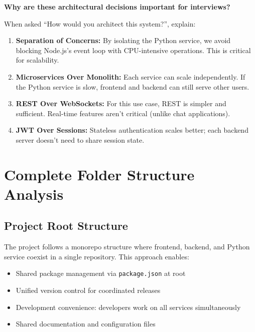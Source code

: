 \documentclass[12pt,a4paper,oneside]{article}
\newcommand{\fileref}[1]{\texttt{#1}}
\begin{document}
\begin{interviewtipbox}
\textbf{Why are these architectural decisions important for interviews?}

When asked ``How would you architect this system?'', explain:

\begin{enumerate}
    \item \textbf{Separation of Concerns:} By isolating the Python service, we avoid blocking Node.js's event loop with CPU-intensive operations. This is critical for scalability.
    \item \textbf{Microservices Over Monolith:} Each service can scale independently. If the Python service is slow, frontend and backend can still serve other users.
    \item \textbf{REST Over WebSockets:} For this use case, REST is simpler and sufficient. Real-time features aren't critical (unlike chat applications).
    \item \textbf{JWT Over Sessions:} Stateless authentication scales better; each backend server doesn't need to share session state.
\end{enumerate}
\end{interviewtipbox}

\newpage


\section{Complete Folder Structure Analysis}

\subsection{Project Root Structure}

The project follows a monorepo structure where frontend, backend, and Python service coexist in a single repository. This approach enables:

\begin{itemize}
    \item Shared package management via \fileref{package.json} at root
    \item Unified version control for coordinated releases
    \item Development convenience: developers work on all services simultaneously
    \item Shared documentation and configuration files
\end{itemize}
\end{document}
